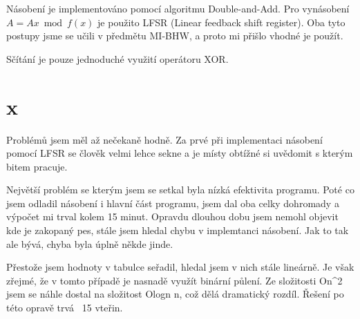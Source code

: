 \documentclass[czech,a4paper,11pt]{article}
\begin{document}
Násobení je implementováno pomocí algoritmu Double-and-Add. Pro vynásobení $A=Ax \bmod {f(x)}$ je použito LFSR (Linear feedback shift register). Oba tyto postupy jsme se učili v předmětu MI-BHW, a proto mi přišlo vhodné je použít.

Sčítání je pouze jednoduché využití operátoru XOR.

\section{x}
Problémů jsem měl až nečekaně hodně. Za prvé při implementaci násobení pomocí LFSR se člověk velmi lehce sekne a je místy obtížné si uvědomit s kterým bitem pracuje.

Největší problém se kterým jsem se setkal byla nízká efektivita programu. Poté co jsem odladil násobení i hlavní část programu, jsem dal oba celky dohromady a výpočet mi trval kolem 15 minut. Opravdu dlouhou dobu jsem nemohl objevit kde je zakopaný pes, stále jsem hledal chybu v implemtanci násobení. Jak to tak ale bývá, chyba byla úplně někde jinde.

Přestože jsem hodnoty v tabulce seřadil, hledal jsem v nich stále lineárně. Je však zřejmé, že v tomto případě je nasnadě využít binární půlení. Ze složitosti On^2 jsem se náhle dostal na složitost Ologn n, což dělá dramatický rozdíl. Řešení po této opravě trvá ~15 vteřin.
\end{document}
